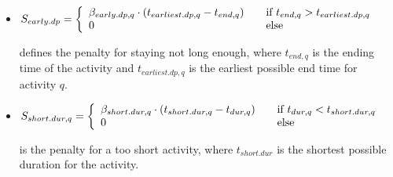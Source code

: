 \begin{itemize}
\item $S_{early.dp} = \left\{
  \begin{array}{l l}
    \beta_{early.dp,q} \cdot (t_{earliest.dp, q} - t_{end,q}) & \quad \text{if $t_{end,q} > t_{earliest.dp,q}$}\\
    0 & \quad \text{else}
  \end{array} \right.$

defines the penalty for staying not long enough, where $t_{end,q}$ is the ending time of the activity and $t_{earliest.dp,q}$ is the earliest possible end time for activity $q$.

\item $ S_{short.dur, q} = \left\{
  \begin{array}{l l}
    \beta_{short.dur,q} \cdot (t_{short.dur, q} - t_{dur,q}) & \quad \text{if $t_{dur,q} < t_{short.dur,q}$}\\
    0 & \quad \text{else}
  \end{array} \right.$
  
  is the penalty for a too short activity, where $t_{short.dur}$ is the shortest possible duration for the activity.
\end{itemize}

